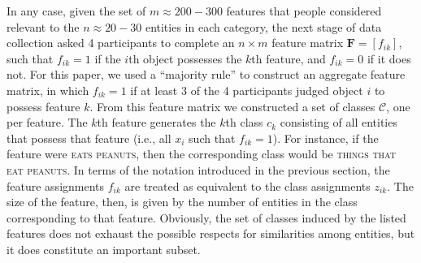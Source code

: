 \documentclass{apa}
\newcommand{\mat}[1]{\mathbf{#1}}
\newcommand{\feature}[1]{\textsc{#1}}
\begin{document}

In any case, given the set of $m \approx 200-300$ features that people considered relevant to the $n \approx 20-30$ entities in each category, the next stage of data collection asked 4 participants to complete an $n \times m$ feature matrix $\mat{F}=[f_{ik}]$, such that $f_{ik}=1$ if the $i$th object possesses the $k$th feature, and $f_{ik}=0$ if it does not. For this paper, we used a ``majority rule'' to construct an aggregate feature matrix, in which $f_{ik}=1$ if at least 3 of the 4 participants judged object $i$ to possess feature $k$. From this feature matrix we constructed a set of classes $\mathcal{C}$, one per feature. The $k$th feature generates the $k$th class $c_k$ consisting of all entities that possess that feature (i.e., all $x_i$ such that $f_{ik}=1$).  For instance, if the feature were \feature{eats peanuts}, then the corresponding class would be \feature{things that eat peanuts}. In terms of the notation introduced in the previous section, the feature assignments $f_{ik}$ are treated as equivalent to the class assignments $z_{ik}$.  The size of the feature, then, is given by the number of entities in the class corresponding to that feature. Obviously, the set of classes induced by the listed features does not exhaust the possible respects for similarities among entities, but it does constitute an important subset.
\end{document}
